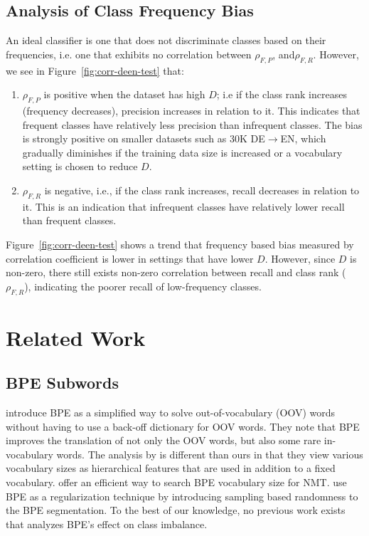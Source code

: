 \subsection{Analysis of Class Frequency Bias}
An ideal classifier is one that does not discriminate classes based on their frequencies, i.e. one that exhibits no correlation between $\rho_{F, P}$, and$\rho_{F, R}$.  
However, we see in Figure~\ref{fig:corr-deen-test} that:
\begin{enumerate}
    \itemsep0em
    \item $\rho_{F, P}$ is positive when the dataset has high $D$; i.e if the class rank increases (frequency decreases), precision increases in relation to it.
    This indicates that frequent classes have relatively less precision than infrequent classes.
    The bias is strongly positive on smaller datasets such as 30K DE$\rightarrow$EN, which gradually diminishes if the training data size is increased or a vocabulary setting is chosen to reduce $D$.
    \item $\rho_{F, R}$ is negative, i.e., if the class rank increases, recall decreases in relation to it. 
    This is an indication that infrequent classes have relatively lower recall than frequent classes.
\end{enumerate}
Figure~\ref{fig:corr-deen-test} shows a trend that frequency based bias measured by correlation coefficient is lower in settings that have lower $D$.
However, since $D$ is non-zero, there still exists non-zero correlation between recall and class rank ($\rho_{F, R}$), indicating the poorer recall of low-frequency classes.

\section{Related Work}
\label{sec:related-work}


\subsection{BPE Subwords} 
\citet{sennrich-etal-2016-bpe} introduce BPE as a simplified way to solve out-of-vocabulary (OOV) words without having to use a back-off dictionary for OOV words.
They note that BPE improves the translation of not only the OOV words, but also some rare in-vocabulary words.
The analysis by \citet{morishita-etal-2018-improving} is different than ours in that they view various vocabulary sizes as hierarchical features that are used in addition to a fixed vocabulary.
\citet{DBLP:journals/corr/abs-1810-08641} offer an efficient way to search BPE vocabulary size for NMT.
\citet{kudo-2018-subwordreg} use BPE as a regularization technique by introducing sampling based randomness to the BPE segmentation. 
To the best of our knowledge, no previous work exists that analyzes BPE's effect on class imbalance.

